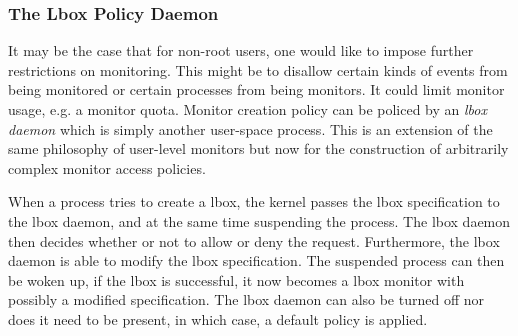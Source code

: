 \subsubsection{The Lbox Policy Daemon}

It may be the case that for non-root users, one would like to impose
further restrictions on monitoring. This might be to disallow certain
kinds of events from being monitored or certain processes from being monitors.
It could limit monitor usage, e.g. a monitor quota.
Monitor creation policy can be policed by an {\em lbox daemon}
which is simply another user-space process.
This is an extension of the same philosophy of user-level monitors but
now for the construction of
arbitrarily complex monitor access policies.

When a process tries to create a lbox, the kernel passes the lbox
specification to the lbox daemon, and at the same time suspending the process.
The lbox daemon then decides whether or not to allow or deny the request.
Furthermore, the lbox daemon is able to modify the lbox specification.
The suspended process can then be woken up, if the lbox is successful,
it now becomes a lbox monitor with possibly a modified specification.
The lbox daemon can also be turned off nor does it need to be present, 
in which case, a default policy is applied.



